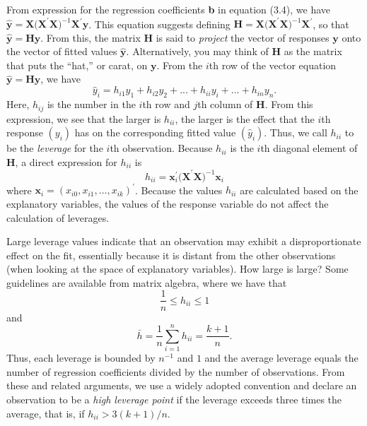 From expression for the regression coefficients \textbf{b} in
equation (3.4), we have $\mathbf{\hat{y}}=
\mathbf{X(X}^{\prime}\mathbf{X)}^{-1}\mathbf{X}^{\prime}\mathbf{y}$.
This equation suggests defining $\mathbf{H} =
\mathbf{X(X}^{\prime}\mathbf{X)}^{-1} \mathbf{X}^{\prime}$, so that
$\mathbf{\hat{y}}=\mathbf{Hy}$. From this,
the matrix $\mathbf{H}$ is said to \textit{project} the vector of responses $%
\mathbf{y}$ onto the vector of fitted values $\mathbf{\hat{y}}$.
Alternatively, you may think of $\mathbf{H}$ as the matrix that puts
the ``hat,'' or carat, on $\mathbf{y}$. From the $i$th row of the
vector equation $\mathbf{\hat{y}=Hy}$, we have
\begin{equation*}
\hat{y}_i=h_{i1}y_1+h_{i2}y_2+...+h_{ii}y_i+...+h_{in}y_{n}.
\end{equation*}
Here, $h_{ij}$ is the number in the $i$th row and $j$th column of
$\mathbf{H} $. From this expression, we see that the larger is
$h_{ii}$, the larger is the effect that the $i$th response $(y_i)$
has on the corresponding fitted value $(\hat{y}_i)$. Thus, we call
$h_{ii}$ to be the \textit{leverage }for the $i$th observation.
Because $h_{ii}$ is the $i$th diagonal element of $\mathbf{H}$, a
direct expression for $h_{ii}$ is
\begin{equation}\label{E5:Leverage}
h_{ii}=\mathbf{x}_i^{\prime}\mathbf{(X}^{\prime}\mathbf{X)}^{-1}\mathbf{x%
}_i
\end{equation} where
$\mathbf{x}_i=(x_{i0},x_{i1},\ldots,x_{ik})^{\prime}$. Because the
values $h_{ii}$ are calculated based on the explanatory variables,
the values of the response variable do not affect the calculation of
leverages.

Large leverage values indicate that an observation may exhibit a
disproportionate effect on the fit, essentially because it is
distant from the other observations (when looking at the space of
explanatory variables). How large is large? Some guidelines are
available from matrix algebra, where we have that
\begin{equation*}
\frac{1}{n}\leq h_{ii}\leq 1
\end{equation*}
and
\begin{equation*}
\bar{h}=\frac{1}{n}\sum_{i=1}^{n}h_{ii}=\frac{k+1}{n}.
\end{equation*}
Thus, each leverage is bounded by $n^{-1}$ and $1$ and the average
leverage equals the number of regression coefficients divided by the
number of observations. From these and related arguments, we use a
widely adopted convention and declare an observation to be a
\textit{high leverage point} if the leverage exceeds three times the
average, that is, if $h_{ii}>3(k+1)/n $.



